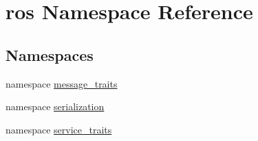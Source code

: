 \hypertarget{namespaceros}{\section{ros \-Namespace \-Reference}
\label{namespaceros}
}
\subsection*{\-Namespaces}
\begin{DoxyCompactItemize}
\item 
namespace \hyperlink{namespaceros_1_1message__traits}{message\-\_\-traits}
\item 
namespace \hyperlink{namespaceros_1_1serialization}{serialization}
\item 
namespace \hyperlink{namespaceros_1_1service__traits}{service\-\_\-traits}
\end{DoxyCompactItemize}
